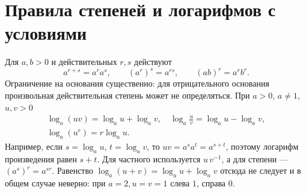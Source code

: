 \section{Правила степеней и логарифмов с условиями}
Для \(a,b>0\) и действительных \(r,s\) действуют
\[
a^{r+s}=a^ra^s,\qquad (a^r)^s=a^{rs},\qquad (ab)^r=a^rb^r.
\]
Ограничение на основания существенно: для отрицательного основания произвольная действительная степень может не определяться. При \(a>0\), \(a\ne1\), \(u,v>0\)
\[
\begin{gathered}
\log_a(uv)=\log_a u+\log_a v,\quad
\log_a\frac uv=\log_a u-\log_a v,\\
\log_a(u^r)=r\log_a u.
\end{gathered}
\]
Например, если \(s=\log_a u\), \(t=\log_a v\), то \(uv=a^sa^t=a^{s+t}\), поэтому логарифм произведения равен \(s+t\). Для частного используется \(u\,v^{-1}\), а для степени — \((a^s)^r=a^{sr}\). Равенство \(\log_a(u+v)=\log_a u+\log_a v\) отсюда не следует и в общем случае неверно: при \(a=2,u=v=1\) слева \(1\), справа \(0\).

